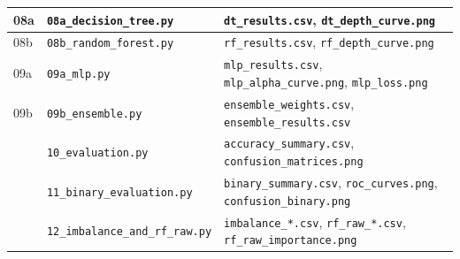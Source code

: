 \documentclass[a4paper]{report}
\begin{document}
{\begin{longtable}{|>{\centering\arraybackslash}p{27.26pt}|>{\raggedright\arraybackslash}p{203.69pt}|>{\raggedright\arraybackslash}p{203.69pt}|}
08a & \texttt{08a\_\allowbreak{}decision\_\allowbreak{}tree.py} & \texttt{dt\_\allowbreak{}results.csv}, \texttt{dt\_\allowbreak{}depth\_\allowbreak{}curve.png} \\ \hline
08b & \texttt{08b\_\allowbreak{}random\_\allowbreak{}forest.py} & \texttt{rf\_\allowbreak{}results.csv}, \texttt{rf\_\allowbreak{}depth\_\allowbreak{}curve.png} \\ \hline
09a & \texttt{09a\_\allowbreak{}mlp.py} & \texttt{mlp\_\allowbreak{}results.csv}, \texttt{mlp\_\allowbreak{}alpha\_\allowbreak{}curve.png}, \texttt{mlp\_\allowbreak{}loss.png} \\ \hline
09b & \texttt{09b\_\allowbreak{}ensemble.py} & \texttt{ensemble\_\allowbreak{}weights.csv}, \texttt{ensemble\_\allowbreak{}results.csv} \\ \hline
10 & \texttt{10\_\allowbreak{}evaluation.py} & \texttt{accuracy\_\allowbreak{}summary.csv}, \texttt{confusion\_\allowbreak{}matrices.png} \\ \hline
11 & \texttt{11\_\allowbreak{}binary\_\allowbreak{}evaluation.py} & \texttt{binary\_\allowbreak{}summary.csv}, \texttt{roc\_\allowbreak{}curves.png}, \texttt{confusion\_\allowbreak{}binary.png} \\ \hline
12 & \texttt{12\_\allowbreak{}imbalance\_\allowbreak{}and\_\allowbreak{}rf\_\allowbreak{}raw.py} & \texttt{imbalance\_\allowbreak{}*.csv}, \texttt{rf\_\allowbreak{}raw\_\allowbreak{}*.csv}, \texttt{rf\_\allowbreak{}raw\_\allowbreak{}importance.png} \\ \hline
\end{longtable}
}

\end{document}
